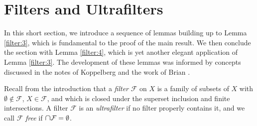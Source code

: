 \section{Filters and Ultrafilters}
In this short section, we introduce a sequence of lemmas building up to Lemma \ref{filter:3}, which is fundamental to the proof of the main result. We then conclude the section with Lemma \ref{filter:4}, which is yet another elegant application of Lemma \ref{filter:3}. The development of these lemmas was informed by concepts discussed in the notes of Koppelberg \cite{notes:2011} and the work of Brian \cite{brian:2016}.

Recall from the introduction that a \emph{filter} \( \mathcal{F}  \) on \( X \) is a family of subsets of \( X \) with \( \emptyset \notin \mathcal{F}  \), \( X \in \mathcal{F}  \), and which is closed under the superset inclusion and finite intersections. A filter \( \mathcal{F}  \) is an \emph{ultrafilter} if no filter properly contains it, and we call \( \mathcal{F}  \) \emph{free} if \( \medcap \mathcal{F} = \emptyset  \).

